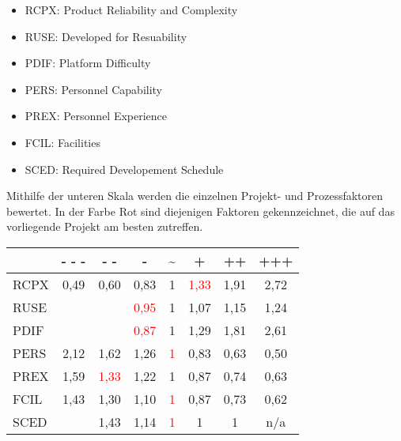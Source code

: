 \documentclass[../review_1.tex]{subfiles}
\begin{document}
\begin{itemize}
    \setlength\itemsep{-1mm}
    \item RCPX: Product Reliability and Complexity
    \item RUSE: Developed for Resuability
    \item PDIF: Platform Difficulty
    \item PERS: Personnel Capability
    \item PREX: Personnel Experience
    \item FCIL: Facilities
    \item SCED: Required Developement Schedule
\end{itemize}
Mithilfe der unteren Skala werden die einzelnen Projekt- und Prozessfaktoren bewertet. In der Farbe Rot sind diejenigen Faktoren gekennzeichnet, die auf das vorliegende Projekt am besten zutreffen.
\begin{center}
    \begin{tabular} [h] {|l|c|c|c|c|c|c|c|}
        \hline & \textbf{- - -} & \textbf{- -}          & \textbf{-}            & \textbf{\textasciitilde} & \textbf{+}            & \textbf{++} & \textbf{+++} \\ \hline
        RCPX   & 0,49           & 0,60                  & 0,83                  & 1                        & \textcolor{red}{1,33} & 1,91        & 2,72         \\ \hline
        RUSE   &                &                       & \textcolor{red}{0,95} & 1                        & 1,07                  & 1,15        & 1,24         \\\hline
        PDIF   &                &                       & \textcolor{red}{0,87} & 1                        & {1,29}                & 1,81        & 2,61         \\ \hline
        PERS   & 2,12           & 1,62                  & {1,26}                & \textcolor{red}{1}       & 0,83                  & 0,63        & 0,50         \\ \hline
        PREX   & 1,59           & \textcolor{red}{1,33} & 1,22                  & 1                        & 0,87                  & 0,74        & 0,63         \\ \hline
        FCIL   & 1,43           & 1,30                  & 1,10                  & \textcolor{red}{1}       & 0,87                  & 0,73        & 0,62         \\ \hline
        SCED   &                & 1,43                  & {1,14}                & \textcolor{red}{1}       & 1                     & 1           & n/a          \\ \hline
    \end{tabular}
\end{center}
\end{document}
